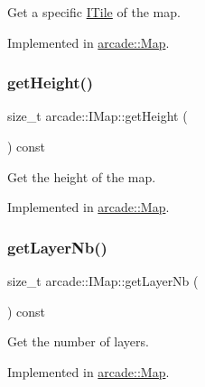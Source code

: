 Get a specific \hyperlink{classarcade_1_1_i_tile}{I\+Tile} of the map. 



Implemented in \hyperlink{classarcade_1_1_map_a8032d00c437cad8cedb646a0a1eb4bb1}{arcade\+::\+Map}.

\mbox{\label{classarcade_1_1_i_map_a9282ac731fa61b8c18241a309efbd6a0}} 
\subsubsection{\texorpdfstring{get\+Height()}{getHeight()}}
{\footnotesize\ttfamily size\+\_\+t arcade\+::\+I\+Map\+::get\+Height (\begin{DoxyParamCaption}{ }\end{DoxyParamCaption}) const\hspace{0.3cm}{\ttfamily [pure virtual]}}



Get the height of the map. 



Implemented in \hyperlink{classarcade_1_1_map_a914cc33687ccf159cc2876fc1d52657d}{arcade\+::\+Map}.

\mbox{\label{classarcade_1_1_i_map_a3e5fc4c5286f92fb49c8c7d0e79f4510}} 
\subsubsection{\texorpdfstring{get\+Layer\+Nb()}{getLayerNb()}}
{\footnotesize\ttfamily size\+\_\+t arcade\+::\+I\+Map\+::get\+Layer\+Nb (\begin{DoxyParamCaption}{ }\end{DoxyParamCaption}) const\hspace{0.3cm}{\ttfamily [pure virtual]}}



Get the number of layers. 



Implemented in \hyperlink{classarcade_1_1_map_a75d832d23939401ffe062b461839bc8d}{arcade\+::\+Map}.

\mbox{\label{classarcade_1_1_i_map_a6e7534eeff05277f1429037f8b01e25f}} 
